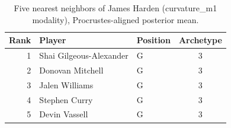 \begin{table}[htbp]
  \centering\small
  \begin{tabular}{rllc}
    \toprule
    Rank & Player & Position & Archetype \\
    \midrule
    1 & Shai Gilgeous-Alexander & G & 3 \\
    2 & Donovan Mitchell & G & 3 \\
    3 & Jalen Williams & G & 3 \\
    4 & Stephen Curry & G & 3 \\
    5 & Devin Vassell & G & 3 \\
    \bottomrule
  \end{tabular}
  \caption{Five nearest neighbors of James Harden (curvature_m1 modality), Procrustes-aligned posterior mean.}
  \label{tab:James_Harden_neighbors_curvature_m1}
\end{table}


